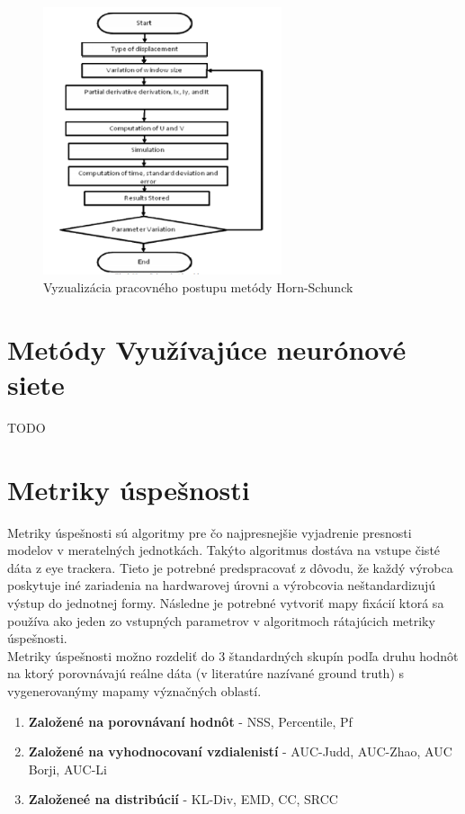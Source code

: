 \begin{figure}[H]
  \centering
  \includegraphics[width=7cm]{pics/horn-schunck.png}
  \caption{Vyzualizácia pracovného postupu metódy Horn-Schunck}
\end{figure}
\vspace{10mm}

\section{Metódy Využívajúce neurónové siete}
TODO

\section{Metriky úspešnosti}
Metriky úspešnosti sú algoritmy pre čo najpresnejšie vyjadrenie presnosti modelov v meratelných jednotkách. Takýto algoritmus dostáva na vstupe čisté dáta z eye trackera. Tieto je potrebné predspracovať z dôvodu, že každý výrobca poskytuje iné zariadenia na hardwarovej úrovni a výrobcovia neštandardizujú výstup do jednotnej formy. Následne je potrebné vytvoriť mapy fixácií ktorá sa používa ako jeden zo vstupných parametrov v algoritmoch rátajúcich metriky úspešnosti. \\
Metriky úspešnosti možno rozdeliť do 3 štandardných skupín podľa druhu hodnôt na ktorý porovnávajú reálne dáta (v literatúre nazívané ground truth) s vygenerovanýmy mapamy význačných oblastí\cite{metrics-1}.
\begin{enumerate}
  \item\textbf{Založené na porovnávaní hodnôt} - NSS, Percentile, Pf
  \item\textbf{Založené na vyhodnocovaní vzdialenistí} - AUC-Judd, AUC-Zhao, AUC Borji, AUC-Li
  \item\textbf{Založeneé na distribúcií} - KL-Div, EMD, CC, SRCC
\end{enumerate}

